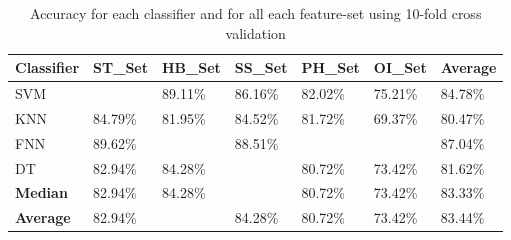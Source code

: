\documentclass[journal,article,submit,moreauthors,pdftex]{Definitions/mdpi}
\begin{document}
\begin{table}[H]
	\caption{Accuracy for each classifier and for all each feature-set using 10-fold cross validation }
	\centering
	\begin{tabular}{p{3cm}p{2cm}p{2cm}p{2cm}p{2cm}p{2cm}p{2cm}}
		\toprule
		\textbf{Classifier} & \textbf{ST\_Set} & \textbf{HB\_Set} & \textbf{SS\_Set} & \textbf{PH\_Set} & \textbf{OI\_Set} & Average \\
		\midrule	
		SVM &  \cellcolor{gray!35}{91.41\%} & 89.11\% & 86.16\% &82.02\% & 75.21\% &84.78\%\\
		KNN & 84.79\% & 81.95\% & 84.52\% &81.72\% & 69.37\%& 80.47\% \\
		FNN & 89.62\% & \cellcolor{gray!35}{95.89\%} & 88.51\% &\cellcolor{gray!35}{83.31\%} & \cellcolor{gray!35}{77.88\%} & 87.04\%\\
		DT & 82.94\% & 84.28\% &  \cellcolor{gray!35}{86.76\%} &80.72\% & 73.42\% &81.62\%\\
		\bottomrule
		
		\textbf{Median} & 82.94\% & 84.28\% &  \cellcolor{gray!35}{86.76\%} &80.72\% & 73.42\% &83.33\%\\
		\bottomrule
		\textbf{Average} & 82.94\% &  \cellcolor{gray!35}{87.80\%}  & 84.28\% &80.72\% & 73.42\% &83.44\%\\
		\bottomrule
	\end{tabular}
	\label{accuracy_classifier_featureset}
\end{table}
\end{document}
